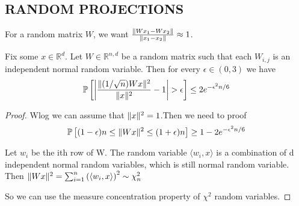 \subsection{RANDOM PROJECTIONS}%

For a random matrix $ W $, we want $ \frac{ \Arrowvert W x_1 - W x_2 \Arrowvert}{ \Arrowvert x_1 - x_2  \Arrowvert} \approx 1 $.

\begin{lemma}
    Fix some $ x \in \mathbb{R}^{d} $. Let $ W \in \mathbb{R}^{n,d} $ be a random matrix such that each $ W_{i,j} $ is an independent normal random variable. Then for every $ \epsilon \in (0, 3) $ we have
    \[
        \mathbb{P}\left[ \left| \frac{ \Arrowvert (1/\sqrt n) W x \Arrowvert^2 }{ \Arrowvert x \Arrowvert^2 } - 1 \right| > \epsilon \right] \le 2 e^{-\epsilon^2 n/6}
    \]
    \begin{proof}
        Wlog we can assume that $ \Arrowvert x \Arrowvert^2 = 1 $.Then we need to proof
        \[
            \mathbb{P}\left[ (1 - \epsilon) n \le \Arrowvert W x \Arrowvert^2 \le (1+\epsilon)n \right] \ge 1 - 2 e^{-\epsilon^2 n / 6}
        \]

        Let $ w_i $ be the ith row of W. The random variable $ \langle w_i, x \rangle $ is a combination of d independent normal random variables, which is still normal random variable.
        Then $ \Arrowvert W x \Arrowvert^2 = \sum^{n}_{i=1} {\left( \langle w_i, x \rangle \right)}^2 \sim \chi^2_n$

        So we can use the measure concentration property of $ \chi^2 $ random variables.
    \end{proof}
\end{lemma}

